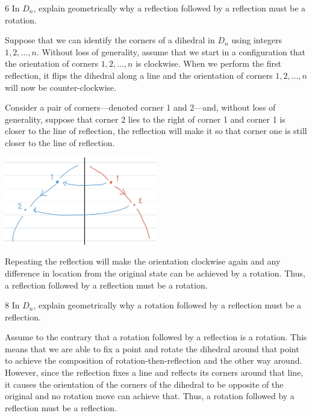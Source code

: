 \begin{hwproblem}
{6}{
    In \(D_n\), explain geometrically why a reflection followed by a reflection must be a rotation.
}

Suppose that we can identify the corners of a dihedral in \(D_n\) using integers \(1, 2, \ldots, n\). Without loss of generality, assume that we start in a configuration that the orientation of corners \(1, 2, \ldots, n\) is clockwise. When we perform the first reflection, it flips the dihedral along a line and the orientation of corners \(1, 2, \ldots, n\) will now be counter-clockwise.

Consider a pair of corners---denoted corner 1 and 2---and, without loss of generality, suppose that corner 2 lies to the right of corner 1 and corner 1 is closer to the line of reflection, the reflection will make it so that corner one is still closer to the line of reflection.
\begin{center}
    \includegraphics[width=0.5\textwidth]{images/reflection.jpg}
\end{center}
Repeating the reflection will make the orientation clockwise again and any difference in location from the original state can be achieved by a rotation. Thus, a reflection followed by a reflection must be a rotation.
\end{hwproblem}

\begin{hwproblem}
{8}{
    In \(D_n\), explain geometrically why a rotation followed by a reflection must be a reflection.
}

Assume to the contrary that a rotation followed by a reflection is a rotation. This means that we are able to fix a point and rotate the dihedral around that point to achieve the composition of rotation-then-reflection and the other way around. However, since the reflection fixes a line and reflects its corners around that line, it causes the orientation of the corners of the dihedral to be opposite of the original and no rotation move can achieve that. Thus, a rotation followed by a reflection must be a reflection.
\end{hwproblem}

